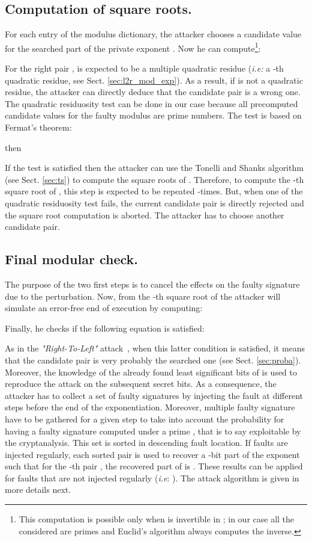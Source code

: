 \documentclass{article}
\begin{document}
\subsection{Computation of square roots.}
\label{sec:sqroots}
For each entry  of the modulus dictionary, the attacker
chooses a candidate value for the searched part of the private
exponent . Now he can compute\footnote[3]{This computation
  is possible only when  is invertible in
  ; in our case all the considered
   are primes and Euclid's algorithm always computes the inverse.}:

For the right pair ,  is expected to be a multiple quadratic residue (\textit{i.e:} a -th quadratic residue, see Sect. \ref{sec:l2r_mod_exp}).
As a result, if  is not a quadratic residue, the attacker can directly deduce that the candidate pair  is a wrong one. The quadratic residuosity test can be done in our case because all precomputed candidate values for the faulty modulus are prime numbers. The test is based on Fermat's theorem:

\begin{center}
then  
\end{center}
If the test is satisfied then the attacker can use the Tonelli and Shanks algorithm (see Sect. \ref{sec:ts}) to compute the square roots of . 
Therefore, to compute the -th square root of , this step is expected to be repeated -times. But, when one of the  quadratic residuosity test fails, the current candidate pair is directly  rejected and the square root computation is aborted. The attacker has to choose another candidate pair.

\subsection{Final modular check.}
The purpose of the two first steps is to cancel the effects on the faulty signature due to the perturbation.
Now, from the -th square root of  the attacker will simulate an error-free end of execution by computing:

Finally, he checks if the following equation is satisfied:

As in the \textit{"Right-To-Left"} attack~\cite{77}, when this latter
condition is satisfied, it means that the candidate pair is very
probably the searched one (see Sect. \ref{sec:proba}). Moreover, the
knowledge of the already found least significant bits of  is used
to reproduce the attack on the subsequent secret bits. As a
consequence, the attacker has to collect a set of faulty signatures
 by injecting the fault at different steps  before
the end of the exponentiation. Moreover, multiple faulty signature
 have to be gathered for a given step  to take
into account the probability for having a faulty signature
 computed under a prime , that is to say
exploitable by the cryptanalysis. 
This set  is sorted in descending fault
location. If faults are injected regularly, each sorted pair is used
to recover a -bit part of the exponent such that for the -th
pair , the recovered part of   
is . These results can be applied for faults
that are not injected regularly (\textit{i.e}: ). The attack algorithm is given in more details next.
\end{document}
